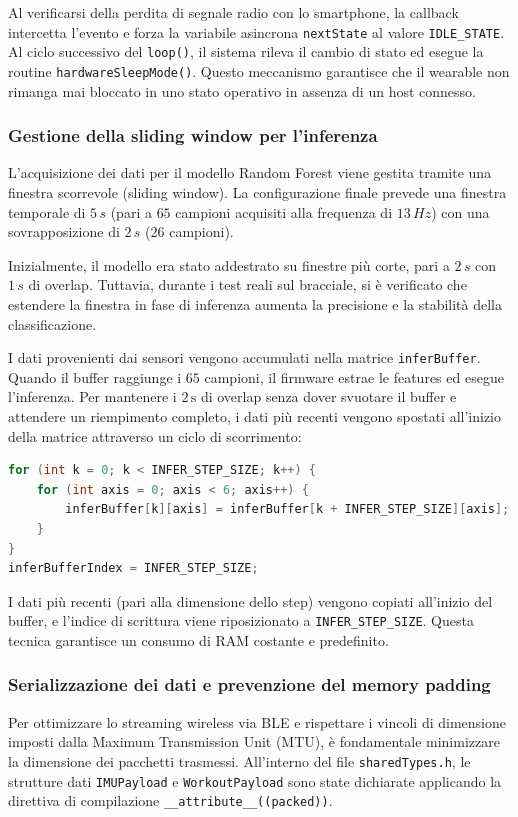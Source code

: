 Al verificarsi della perdita di segnale radio con lo smartphone, la callback intercetta l'evento e forza la variabile asincrona \texttt{nextState} al valore \texttt{IDLE\_STATE}. Al ciclo successivo del \texttt{loop()}, il sistema rileva il cambio di stato ed esegue la routine \texttt{hardwareSleepMode()}.
Questo meccanismo garantisce che il wearable non rimanga mai bloccato in uno stato operativo in assenza di un host connesso.

\subsubsection{Gestione della sliding window per l'inferenza}
L'acquisizione dei dati per il modello Random Forest viene gestita tramite una finestra scorrevole (sliding window). La configurazione finale prevede una finestra temporale di $5\,s$ (pari a $65$ campioni acquisiti alla frequenza di $13\,Hz$) con una sovrapposizione di $2\,s$ ($26$ campioni).

Inizialmente, il modello era stato addestrato su finestre più corte, pari a $2\,s$ con $1\,s$ di overlap. Tuttavia, durante i test reali sul bracciale, si è verificato che estendere la finestra in fase di inferenza aumenta la precisione e la stabilità della classificazione.

I dati provenienti dai sensori vengono accumulati nella matrice \texttt{inferBuffer}. Quando il buffer raggiunge i $65$ campioni, il firmware estrae le features ed esegue l'inferenza. Per mantenere i $2\,\text{s}$ di overlap senza dover svuotare il buffer e attendere un riempimento completo, i dati più recenti vengono spostati all'inizio della matrice attraverso un ciclo di scorrimento:

\begin{lstlisting}[language=C++, caption={Scorrimento dei dati nel buffer per la gestione dell'overlap.}]
for (int k = 0; k < INFER_STEP_SIZE; k++) {
    for (int axis = 0; axis < 6; axis++) {
        inferBuffer[k][axis] = inferBuffer[k + INFER_STEP_SIZE][axis];
    }
}
inferBufferIndex = INFER_STEP_SIZE;
\end{lstlisting}

I dati più recenti (pari alla dimensione dello step) vengono copiati all'inizio del buffer, e l'indice di scrittura viene riposizionato a \texttt{INFER\_STEP\_SIZE}.
Questa tecnica garantisce un consumo di RAM costante e predefinito.

\subsubsection{Serializzazione dei dati e prevenzione del memory padding}
Per ottimizzare lo streaming wireless via BLE e rispettare i vincoli di dimensione imposti dalla Maximum Transmission Unit (MTU), è fondamentale minimizzare la dimensione dei pacchetti trasmessi. All'interno del file \texttt{sharedTypes.h}, le strutture dati \texttt{IMUPayload} e \texttt{WorkoutPayload} sono state dichiarate applicando la direttiva di compilazione \texttt{\_\_attribute\_\_((packed))}.


